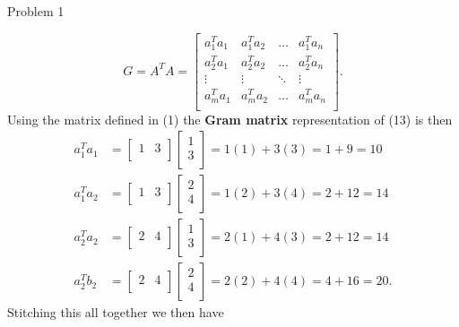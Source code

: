 \begin{problem}{Problem 1}
\begin{Highlight}[Solution]
        \begin{equation}
            G = A^{T}A = 
            \begin{bmatrix}
                a_{1}^{T}a_{1} & a_{1}^{T}a_{2} & \dots & a_{1}^{T}a_{n} \\
                a_{2}^{T}a_{1} & a_{2}^{T}a_{2} & \dots & a_{2}^{T}a_{n} \\
                \vdots & \vdots & \ddots & \vdots \\
                a_{m}^{T}a_{1} & a_{m}^{T}a_{2} & \dots & a_{m}^{T}a_{n} \\
            \end{bmatrix}.
        \end{equation}
        Using the matrix defined in (1) the \textbf{Gram matrix} representation of (13) is then 
        \begin{align*}
            a_{1}^{T}a_{1} & = 
            \begin{bmatrix}
                1 & 3 \\
            \end{bmatrix}
            \begin{bmatrix}
                1 \\
                3 \\
            \end{bmatrix}
            = 1(1) + 3(3) = 1 + 9 = 10 \\
            a_{1}^{T}a_{2} & = 
            \begin{bmatrix}
                1 & 3 \\
            \end{bmatrix}
            \begin{bmatrix}
                2 \\
                4 \\
            \end{bmatrix}
            = 1(2) + 3(4) = 2 + 12 = 14 \\
            a_{2}^{T}a_{2} & = 
            \begin{bmatrix}
                2 & 4 \\
            \end{bmatrix}
            \begin{bmatrix}
                1 \\
                3 \\
            \end{bmatrix}
            = 2(1) + 4(3) = 2 + 12 = 14 \\
            a_{2}^{T}b_{2} & = 
            \begin{bmatrix}
                2 & 4 \\
            \end{bmatrix}
            \begin{bmatrix}
                2 \\
                4 \\
            \end{bmatrix}
            = 2(2) + 4(4) = 4 + 16 = 20.
        \end{align*}
        Stitching this all together we then have 


\end{Highlight}
\end{problem}
